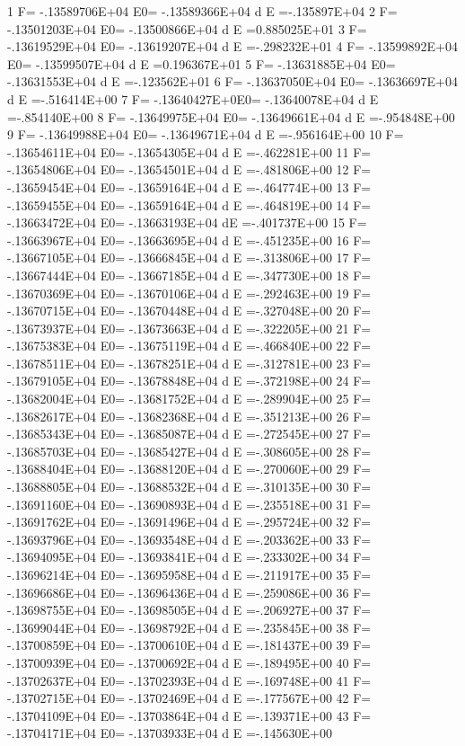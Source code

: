    1 F= -.13589706E+04 E0= -.13589366E+04  d E =-.135897E+04
   2 F= -.13501203E+04 E0= -.13500866E+04  d E =0.885025E+01
   3 F= -.13619529E+04 E0= -.13619207E+04  d E =-.298232E+01
   4 F= -.13599892E+04 E0= -.13599507E+04  d E =0.196367E+01
   5 F= -.13631885E+04 E0= -.13631553E+04  d E =-.123562E+01
   6 F= -.13637050E+04 E0= -.13636697E+04  d E =-.516414E+00
   7 F= -.13640427E+0E0= -.13640078E+04  d E =-.854140E+00
   8 F= -.13649975E+04 E0= -.13649661E+04  d E =-.954848E+00
   9 F= -.13649988E+04 E0= -.13649671E+04  d E =-.956164E+00
  10 F= -.13654611E+04 E0= -.13654305E+04  d E =-.462281E+00
  11 F= -.13654806E+04 E0= -.13654501E+04  d E =-.481806E+00
  12 F= -.13659454E+04 E0= -.13659164E+04  d E =-.464774E+00
  13 F= -.13659455E+04 E0= -.13659164E+04  d E =-.464819E+00
  14 F= -.13663472E+04 E0= -.13663193E+04  dE =-.401737E+00
  15 F= -.13663967E+04 E0= -.13663695E+04  d E =-.451235E+00
  16 F= -.13667105E+04 E0= -.13666845E+04  d E =-.313806E+00
  17 F= -.13667444E+04 E0= -.13667185E+04  d E =-.347730E+00
  18 F= -.13670369E+04 E0= -.13670106E+04  d E =-.292463E+00
  19 F= -.13670715E+04 E0= -.13670448E+04  d E =-.327048E+00
  20 F= -.13673937E+04 E0= -.13673663E+04  d E =-.322205E+00
  21 F= -.13675383E+04 E0= -.13675119E+04  d E =-.466840E+00
  22 F= -.13678511E+04 E0= -.13678251E+04  d E =-.312781E+00
  23 F= -.13679105E+04 E0= -.13678848E+04  d E =-.372198E+00
  24 F= -.13682004E+04 E0= -.13681752E+04  d E =-.289904E+00
  25 F= -.13682617E+04 E0= -.13682368E+04  d E =-.351213E+00
  26 F= -.13685343E+04 E0= -.13685087E+04  d E =-.272545E+00
  27 F= -.13685703E+04 E0= -.13685427E+04  d E =-.308605E+00
  28 F= -.13688404E+04 E0= -.13688120E+04  d E =-.270060E+00
  29 F= -.13688805E+04 E0= -.13688532E+04  d E =-.310135E+00
  30 F= -.13691160E+04 E0= -.13690893E+04  d E =-.235518E+00
  31 F= -.13691762E+04 E0= -.13691496E+04  d E =-.295724E+00
  32 F= -.13693796E+04 E0= -.13693548E+04  d E =-.203362E+00
  33 F= -.13694095E+04 E0= -.13693841E+04  d E =-.233302E+00
  34 F= -.13696214E+04 E0= -.13695958E+04  d E =-.211917E+00
  35 F= -.13696686E+04 E0= -.13696436E+04  d E =-.259086E+00
  36 F= -.13698755E+04 E0= -.13698505E+04  d E =-.206927E+00
  37 F= -.13699044E+04 E0= -.13698792E+04  d E =-.235845E+00
  38 F= -.13700859E+04 E0= -.13700610E+04  d E =-.181437E+00
  39 F= -.13700939E+04 E0= -.13700692E+04  d E =-.189495E+00
  40 F= -.13702637E+04 E0= -.13702393E+04  d E =-.169748E+00
  41 F= -.13702715E+04 E0= -.13702469E+04  d E =-.177567E+00
  42 F= -.13704109E+04 E0= -.13703864E+04  d E =-.139371E+00
  43 F= -.13704171E+04 E0= -.13703933E+04  d E =-.145630E+00
